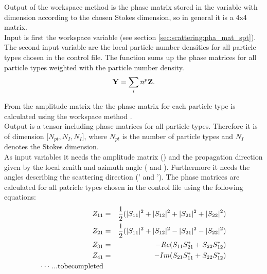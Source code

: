 \label{sec:scattering:tot_pha_mat}

\label{sec:scattering:pha_mat}

Output of the workspace method  is the phase
matrix stored in the variable   with dimension
according to the chosen Stokes
dimension, so in general it is a 4x4 matrix.\\
Input is first the workspace variable  (see section
\ref{sec:scattering:pha_mat_spt}). The second input variable are the
local particle number densities  for all particle types
chosen in the control file.
The function sums up the phase matrices for all particle types
weighted with the particle number density.
\begin{eqnarray}
{\bf Y} = \sum_i{n^p{\bf Z}}.
\end{eqnarray}

\label{sec:scattering:pha_mat_spt}

From the amplitude matrix the the phase matrix for each
particle type is calculated using the workspace method
.\\
Output is a tensor including phase matrices for all particle
types. Therefore it is  of  dimension
[$N_{pt}, N_{I}, N_{I}$], where $N_{pt}$ is the number of particle
types  and $N_{I}$ denotes the Stokes dimension.\\
As input variables it needs the amplitude matrix ()
and the propagation direction given by the local zenith and azimuth
angle ( and ). Furthermore it needs the
angles describing the scattering direction  (' and
'). 
The phase matrices \PhaMat{} are
calculated for all patricle types chosen in the control
file using the following equations: 
\begin{eqnarray}
   Z_{11} &=& \frac{1}{2}(|S_{11}|^2+|S_{12}|^2+|S_{21}|^2+|S_{22}|^2)\\
   Z_{21} &=& \frac{1}{2}(|S_{11}|^2+|S_{12}|^2-|S_{21}|^2-|S_{22}|^2)\\
   Z_{31} &=& -Re(S_{11}S_{21}^*+S_{22}S_{12}^*)\\
   Z_{41} &=& -Im(S_{21}S_{11}^*+S_{22}S_{12}^*)\\
\cdots ... {\rm to be completed}
\end{eqnarray}






